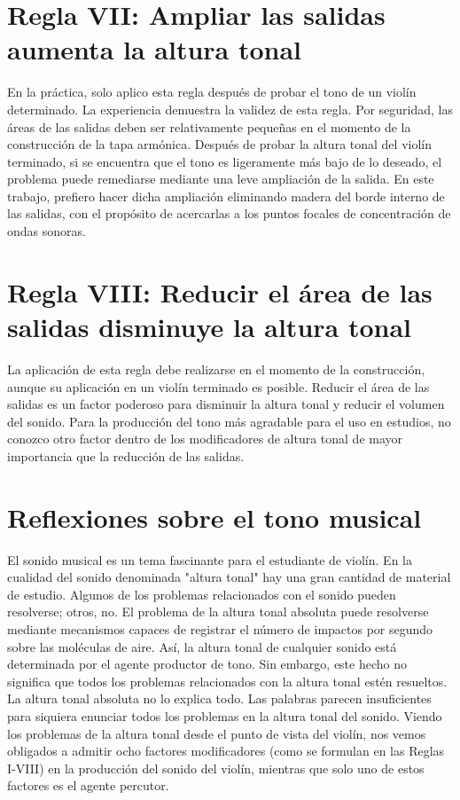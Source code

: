 \documentclass[12pt]{book}
\begin{document}
\section*{Regla VII: Ampliar las salidas aumenta la altura tonal}

En la práctica, solo aplico esta regla después de probar el tono de un violín determinado. La experiencia demuestra la validez de esta regla. Por seguridad, las áreas de las salidas deben ser relativamente pequeñas en el momento de la construcción de la tapa armónica. Después de probar la altura tonal del violín terminado, si se encuentra que el tono es ligeramente más bajo de lo deseado, el problema puede remediarse mediante una leve ampliación de la salida. En este trabajo, prefiero hacer dicha ampliación eliminando madera del borde interno de las salidas, con el propósito de acercarlas a los puntos focales de concentración de ondas sonoras.

\section*{Regla VIII: Reducir el área de las salidas disminuye la altura tonal}

La aplicación de esta regla debe realizarse en el momento de la construcción, aunque su aplicación en un violín terminado es posible. Reducir el área de las salidas es un factor poderoso para disminuir la altura tonal y reducir el volumen del sonido. Para la producción del tono más agradable para el uso en estudios, no conozco otro factor dentro de los modificadores de altura tonal de mayor importancia que la reducción de las salidas.

\section*{Reflexiones sobre el tono musical}

El sonido musical es un tema fascinante para el estudiante de violín. En la cualidad del sonido denominada "altura tonal" hay una gran cantidad de material de estudio. Algunos de los problemas relacionados con el sonido pueden resolverse; otros, no. El problema de la altura tonal absoluta puede resolverse mediante mecanismos capaces de registrar el número de impactos por segundo sobre las moléculas de aire. Así, la altura tonal de cualquier sonido está determinada por el agente productor de tono. Sin embargo, este hecho no significa que todos los problemas relacionados con la altura tonal estén resueltos. La altura tonal absoluta no lo explica todo. Las palabras parecen insuficientes para siquiera enunciar todos los problemas en la altura tonal del sonido. Viendo los problemas de la altura tonal desde el punto de vista del violín, nos vemos obligados a admitir ocho factores modificadores (como se formulan en las Reglas I-VIII) en la producción del sonido del violín, mientras que solo uno de estos factores es el agente percutor.
\end{document}

